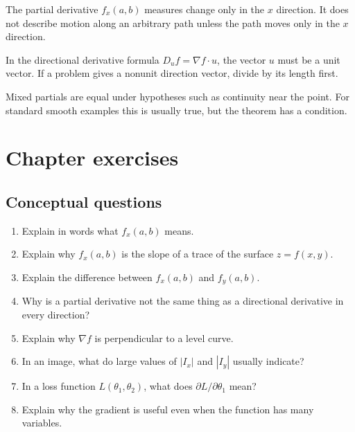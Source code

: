 \documentclass[11pt]{article}
\newcommand{\grad}{\nabla}
\begin{document}
\begin{warningbox}
The partial derivative $f_x(a,b)$ measures change only in the $x$ direction. It does not describe motion along an arbitrary path unless the path moves only in the $x$ direction.
\end{warningbox}

\begin{warningbox}
In the directional derivative formula $D_u f=\grad f\cdot u$, the vector $u$ must be a unit vector. If a problem gives a nonunit direction vector, divide by its length first.
\end{warningbox}

\begin{warningbox}
Mixed partials are equal under hypotheses such as continuity near the point. For standard smooth examples this is usually true, but the theorem has a condition.
\end{warningbox}

\section{Chapter exercises}

\subsection*{Conceptual questions}
\begin{enumerate}
  \item Explain in words what $f_x(a,b)$ means.
  \item Explain why $f_x(a,b)$ is the slope of a trace of the surface $z=f(x,y)$.
  \item Explain the difference between $f_x(a,b)$ and $f_y(a,b)$.
  \item Why is a partial derivative not the same thing as a directional derivative in every direction?
  \item Explain why $\grad f$ is perpendicular to a level curve.
  \item In an image, what do large values of $|I_x|$ and $|I_y|$ usually indicate?
  \item In a loss function $L(\theta_1,\theta_2)$, what does $\partial L/\partial \theta_1$ mean?
  \item Explain why the gradient is useful even when the function has many variables.
\end{enumerate}
\end{document}
